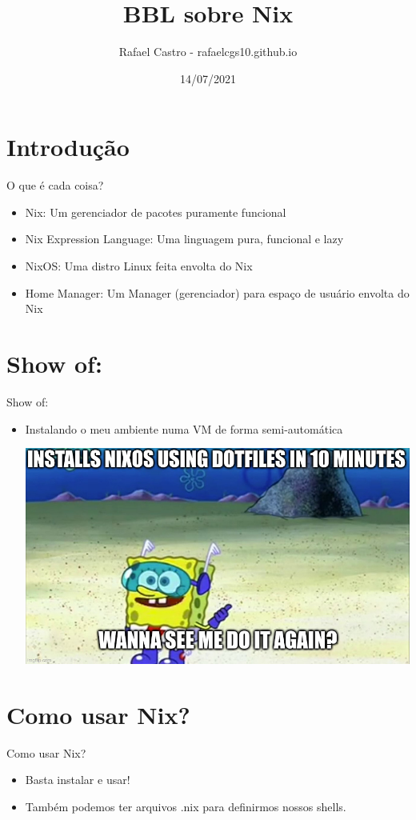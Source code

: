 \documentclass[presentation]{beamer}
\author{Rafael Castro - rafaelcgs10.github.io}
\date{14/07/2021}
\title{BBL sobre Nix}
\begin{document}
\maketitle

\section{Introdução}
\label{sec:orgf4fe69f}
\begin{frame}[label={sec:org4e2af5a}]{O que é cada coisa?}
\begin{itemize}
\item Nix: Um gerenciador de pacotes \alert{puramente funcional}
\item Nix Expression Language: Uma linguagem pura, funcional e lazy
\item NixOS: Uma distro Linux feita envolta do Nix
\item Home Manager: Um Manager (gerenciador) para espaço de usuário envolta do Nix
\end{itemize}
\end{frame}

\section{Show of:}
\label{sec:orgec91eae}
\begin{frame}[label={sec:orgc7d9a74}]{Show of:}
\begin{itemize}
\item Instalando o meu ambiente numa VM de forma semi-automática
\begin{center}
\includegraphics[width=.9\linewidth]{./meme1.jpg}
\end{center}
\end{itemize}
\end{frame}

\section{Como usar Nix?}
\label{sec:org7768d98}
\begin{frame}[label={sec:orgb31a0dd}]{Como usar Nix?}
\begin{itemize}
\item Basta instalar e usar!
\item Também podemos ter arquivos .nix para definirmos nossos shells.
\end{itemize}
\end{frame}
\end{document}

